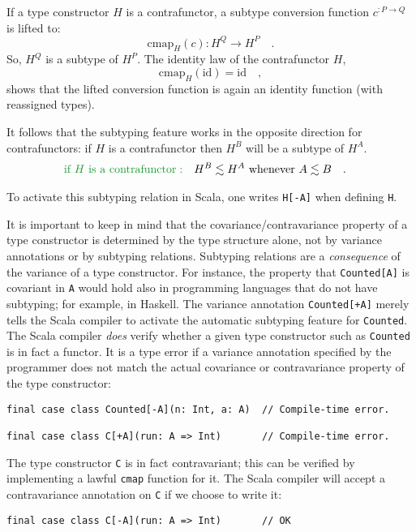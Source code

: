 If a type constructor $H$ is a contrafunctor, a subtype conversion
function $c^{:P\rightarrow Q}$ is lifted to:
\[
\text{cmap}_{H}(c):H^{Q}\rightarrow H^{P}\quad.
\]
So,  $H^{Q}$ is a subtype of $H^{P}$. The identity law of the contrafunctor
$H$,
\[
\text{cmap}_{H}(\text{id})=\text{id}\quad,
\]
shows that the lifted conversion function is again an identity function
(with reassigned types).

It follows that the subtyping feature works in the opposite direction
for contrafunctors: if $H$ is a contrafunctor then $H^{B}$ will
be a subtype of $H^{A}$.
\begin{align*}
{\color{greenunder}\text{if }H\text{ is a contrafunctor}:}\quad & H^{B}\lesssim H^{A}\text{ whenever }A\lesssim B\quad.
\end{align*}

To activate this subtyping relation in Scala, one writes \lstinline!H[-A]!
when defining \lstinline!H!.

It is important to keep in mind that the covariance/contravariance
property of a type constructor is determined by the type structure
alone, not by variance annotations or by subtyping relations. Subtyping
relations are a \emph{consequence} of the variance of a type constructor.
For instance, the property that \lstinline!Counted[A]! is covariant
in \lstinline!A! would hold also in programming languages that do
not have subtyping; for example, in Haskell. The variance annotation
\lstinline!Counted[+A]! merely tells the Scala compiler to activate
the automatic subtyping feature for \lstinline!Counted!. The Scala
compiler \emph{does} verify whether a given type constructor such
as \lstinline!Counted! is in fact a functor. It is a type error if
a variance annotation specified by the programmer does not match the
actual covariance or contravariance property of the type constructor:
\begin{lstlisting}
final case class Counted[-A](n: Int, a: A)  // Compile-time error.

final case class C[+A](run: A => Int)       // Compile-time error.
\end{lstlisting}
The type constructor \lstinline!C! is in fact contravariant; this
can be verified by implementing a lawful \lstinline!cmap! function
for it. The Scala compiler will accept a contravariance annotation
on \lstinline!C! if we choose to write it:
\begin{lstlisting}
final case class C[-A](run: A => Int)       // OK
\end{lstlisting}


